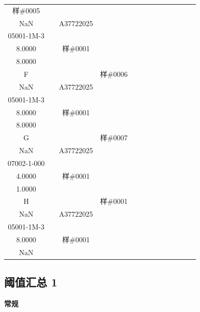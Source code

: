 \documentclass[UTF8,10pt,a4paper,fontset=fandol]{ctexart}
\newcommand{\fieldvalue}[1]{#1}
\begin{document}
\begin{tabular}{c|*{12}{c|}}
\fieldvalue{\scriptsize 样\#0005\\NaN}&
&%
\fieldvalue{\scriptsize A37722025\\05001-1M-3\\8.0000}&
&%
\fieldvalue{\scriptsize 样\#0001\\8.0000}&
&&&&\\ \hline
F&&&%
\fieldvalue{\scriptsize 样\#0006\\NaN}&
&%
\fieldvalue{\scriptsize A37722025\\05001-1M-3\\8.0000}&
&%
\fieldvalue{\scriptsize 样\#0001\\8.0000}&
&&&&\\ \hline
G&&&%
\fieldvalue{\scriptsize 样\#0007\\NaN}&
&%
\fieldvalue{\scriptsize A37722025\\07002-1-000\\4.0000}&
&%
\fieldvalue{\scriptsize 样\#0001\\1.0000}&
&&&&\\ \hline
H&&&%
\fieldvalue{\scriptsize 样\#0001\\NaN}&
&%
\fieldvalue{\scriptsize A37722025\\05001-1M-3\\8.0000}&
&%
\fieldvalue{\scriptsize 样\#0001\\NaN}&
&&&&\\ \hline
\end{tabular}

\subsection{阈值汇总 1}

\textbf{常规}
\end{document}
